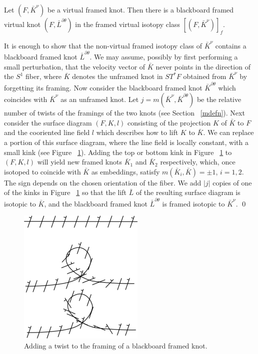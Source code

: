 \begin{prop} Let $(F,\bar{K}^\nu)$ be a virtual framed knot.  Then there is a blackboard framed virtual knot $(F,\bar{L}^{\partial \theta})$ in the framed virtual isotopy class $[(F,\bar{K}^\nu)]_f$.
\end{prop}
\pp It is enough to show that the non-virtual framed isotopy class of $\bar{K}^\nu$ contains a blackboard framed knot $\bar{L}^{\partial \theta}$.  We may assume, possibly by first performing a small perturbation, that the velocity vector of $\bar{K}$ never points in the direction of the $S^1$ fiber, where $\bar{K}$ denotes the unframed knot in $ST^*F$ obtained from $\bar{K}^\nu$ by forgetting its framing.  Now consider the blackboard framed knot $\bar{K}^{\partial \theta}$ which coincides with $\bar{K}^\nu$ as an unframed knot.  Let $j=m(\bar{K}^\nu,\bar{K}^{\partial \theta})$ be the relative number of twists of the framings of the two knots (see Section ~\ref{mdefn}).  Next consider the surface diagram $(F,K,l)$ consisting of the projection $K$ of $\bar{K}$ to $F$ and the cooriented line field $l$ which describes how to lift $K$ to $\bar{K}$. We can replace a portion of this surface diagram, where the line field is locally constant, with a small kink (see Figure ~\ref{blackboardkinks.fig}).  Adding the top or bottom kink in Figure ~\ref{blackboardkinks.fig} to $(F,K,l)$ will yield new framed knots $\bar{K}_1$ and $\bar{K}_2$ respectively, which, once isotoped to coincide with $\bar{K}$ as embeddings, satisfy $m(\bar{K}_i,\bar{K})=\pm 1$, $i=1,2$.  The sign depends on the chosen orientation of the fiber.  We add $|j|$ copies of one of the kinks in Figure ~\ref{blackboardkinks.fig} so that the lift $\bar{L}$ of the resulting surface diagram is isotopic to $\bar{K}$, and the blackboard framed knot $\bar{L}^{\partial \theta}$ is framed isotopic to $\bar{K}^\nu$. 	\qed

\begin{figure}[htbp]
	\centering
	\includegraphics[width=6cm]{blackboardkinks}
	\caption{Adding a twist to the framing of a blackboard framed knot.}
	\label{blackboardkinks.fig}
\end{figure}

